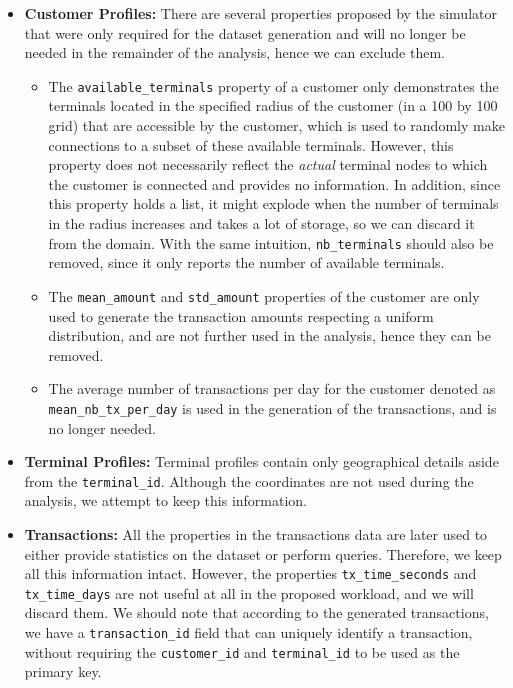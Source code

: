\begin{itemize}
\tightlist
\item
  \textbf{Customer Profiles:} There are several properties proposed by
  the simulator that were only required for the dataset generation and
  will no longer be needed in the remainder of the analysis, hence we
  can exclude them.

  \begin{itemize}
  \tightlist
  \item
    The \texttt{available\_terminals} property of a customer only
    demonstrates the terminals located in the specified radius of the
    customer (in a 100 by 100 grid) that are accessible by the customer,
    which is used to randomly make connections to a subset of these
    available terminals. However, this property does not necessarily
    reflect the \emph{actual} terminal nodes to which the customer is
    connected and provides no information. In addition, since this
    property holds a list, it might explode when the number of terminals
    in the radius increases and takes a lot of storage, so we can
    discard it from the domain. With the same intuition,
    \texttt{nb\_terminals} should also be removed, since it only reports
    the number of available terminals.
  \item
    The \texttt{mean\_amount} and \texttt{std\_amount} properties of the
    customer are only used to generate the transaction amounts
    respecting a uniform distribution, and are not further used in the
    analysis, hence they can be removed.
  \item
    The average number of transactions per day for the customer denoted
    as \texttt{mean\_nb\_tx\_per\_day} is used in the generation of the
    transactions, and is no longer needed.
  \end{itemize}
\item
  \textbf{Terminal Profiles:} Terminal profiles contain only
  geographical details aside from the \texttt{terminal\_id}. Although
  the coordinates are not used during the analysis, we attempt to keep
  this information.
\item
  \textbf{Transactions:} All the properties in the transactions data are
  later used to either provide statistics on the dataset or perform
  queries. Therefore, we keep all this information intact. However, the
  properties \texttt{tx\_time\_seconds} and \texttt{tx\_time\_days} are
  not useful at all in the proposed workload, and we will discard them.
  We should note that according to the generated transactions, we have a
  \texttt{transaction\_id} field that can uniquely identify a
  transaction, without requiring the \texttt{customer\_id} and
  \texttt{terminal\_id} to be used as the primary key.
\end{itemize}

